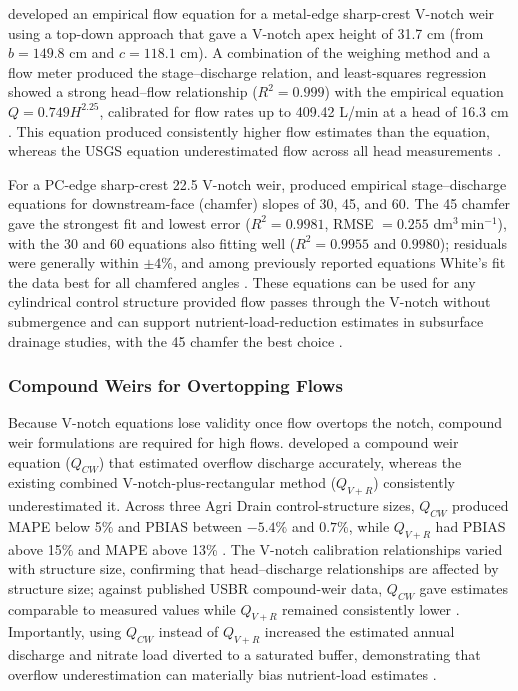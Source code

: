 \textcite{BinShokrana2021} developed an empirical flow equation for a metal-edge
sharp-crest V-notch weir using a top-down approach that gave a V-notch apex height of
31.7 cm (from $b = 149.8$ cm and $c = 118.1$ cm). A combination of the weighing method and
a flow meter produced the stage--discharge relation, and least-squares regression showed a
strong head--flow relationship ($R^2 = 0.999$) with the empirical equation
$Q = 0.749 H^{2.25}$, calibrated for flow rates up to 409.42 L/min at a head of 16.3 cm
\parencite{BinShokrana2021}. This equation produced consistently higher flow estimates than
the \textcite{Christianson2019} equation, whereas the USGS equation underestimated flow
across all head measurements \parencite{BinShokrana2021}.

For a PC-edge sharp-crest 22.5\textdegree{} V-notch weir, \textcite{Napierala2023} produced
empirical stage--discharge equations for downstream-face (chamfer) slopes of 30\textdegree,
45\textdegree, and 60\textdegree. The 45\textdegree{} chamfer gave the strongest fit and
lowest error ($R^2 = 0.9981$, RMSE $= 0.255$ dm$^3$\,min$^{-1}$), with the 30\textdegree{}
and 60\textdegree{} equations also fitting well ($R^2 = 0.9955$ and $0.9980$); residuals
were generally within $\pm 4\%$, and among previously reported equations White's fit the
data best for all chamfered angles \parencite{Napierala2023}. These equations can be used
for any cylindrical control structure provided flow passes through the V-notch without
submergence and can support nutrient-load-reduction estimates in subsurface drainage
studies, with the 45\textdegree{} chamfer the best choice \parencite{Napierala2023}.

\subsubsection{Compound Weirs for Overtopping Flows}

Because V-notch equations lose validity once flow overtops the notch, compound weir
formulations are required for high flows. \textcite{Katuwal2024} developed a compound weir
equation ($Q_{CW}$) that estimated overflow discharge accurately, whereas the existing
combined V-notch-plus-rectangular method ($Q_{V+R}$) consistently underestimated it. Across
three Agri Drain control-structure sizes, $Q_{CW}$ produced MAPE below 5\% and PBIAS
between $-5.4\%$ and $0.7\%$, while $Q_{V+R}$ had PBIAS above 15\% and MAPE above 13\%
\parencite{Katuwal2024}. The V-notch calibration relationships varied with structure size,
confirming that head--discharge relationships are affected by structure size; against
published USBR compound-weir data, $Q_{CW}$ gave estimates comparable to measured values
while $Q_{V+R}$ remained consistently lower \parencite{Katuwal2024}. Importantly, using
$Q_{CW}$ instead of $Q_{V+R}$ increased the estimated annual discharge and nitrate load
diverted to a saturated buffer, demonstrating that overflow underestimation can materially
bias nutrient-load estimates \parencite{Katuwal2024}.

